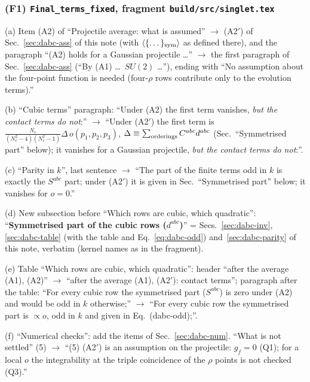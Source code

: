 \subsubsection*{(F1) \texttt{Final\_terms\_fixed}, fragment \texttt{build/src/singlet.tex}}
\noindent (a) Item (A2) of ``Projectile average: what is assumed'' $\to$ (A2$'$) of Sec.~\ref{sec:dabc-ass} of this note (with $\langle\{\dots\}_{\rm sym}\rangle$ as defined there), and the paragraph ``(A2) holds for a Gaussian projectile \dots'' $\to$ the first paragraph of Sec.~\ref{sec:dabc-ass} (``By (A1) \dots\ $SU(2)$ \dots''), ending with ``No assumption about the four-point function is needed (four-$\rho$ rows contribute only to the evolution terms).''\par
\noindent (b) ``Cubic terms'' paragraph: ``Under (A2) the first term vanishes, \emph{but the contact terms do not}:'' $\to$ ``Under (A2$'$) the first term is $\frac{N_{c}}{(N_{c}^{2}-4)(N_{c}^{2}-1)}\Delta\,o(p_{1},p_{2},p_{3})$, $\Delta\equiv\sum_{\rm orderings}C^{abc}d^{abc}$ (Sec.~``Symmetrised part'' below); it vanishes for a Gaussian projectile, \emph{but the contact terms do not}:''.\par
\noindent (c) ``Parity in $k$'', last sentence $\to$ ``The part of the finite terms odd in $k$ is exactly the $S^{abc}$ part; under (A2$'$) it is given in Sec.~``Symmetrised part'' below; it vanishes for $o=0$.''\par
\noindent (d) New subsection before ``Which rows are cubic, which quadratic'': ``\textbf{Symmetrised part of the cubic rows ($d^{abc}$)}'' = Secs.~\ref{sec:dabc-inv}, \ref{sec:dabc-table} (with the table and Eq.~\eqref{eq:dabc-odd}) and~\ref{sec:dabc-parity} of this note, verbatim (kernel names as in the fragment).\par
\noindent (e) Table ``Which rows are cubic, which quadratic'': header ``after the average (A1), (A2)'' $\to$ ``after the average (A1), (A2$'$): contact terms''; paragraph after the table: ``For every cubic row the symmetrised part ($S^{abc}$) is zero under (A2) and would be odd in $k$ otherwise;'' $\to$ ``For every cubic row the symmetrised part is $\propto o$, odd in $k$ and given in Eq.~(dabc-odd);''.\par
\noindent (f) ``Numerical checks'': add the items of Sec.~\ref{sec:dabc-num}. ``What is not settled'' (5) $\to$ ``(5) (A2$'$) is an assumption on the projectile: $g_{f}=0$ (Q1); for a local $o$ the integrability at the triple coincidence of the $\rho$ points is not checked (Q3).''
\endgroup
